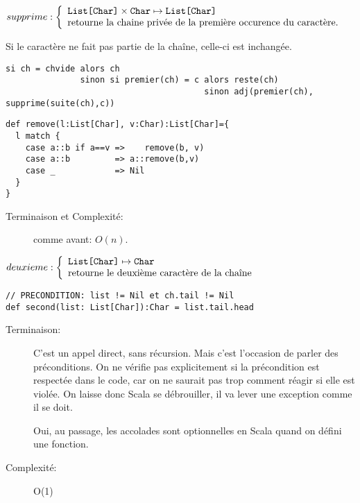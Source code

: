 \documentclass[10pt]{article}\usepackage[nu]{esial}
\begin{document}
\begin{Question}
  $supprime: \left\{
    \begin{array}{l}
      \text{\texttt{List[Char]}}\times \text{\texttt{Char}}\mapsto \text{\texttt{List[Char]}}\\
      \text{retourne la chaine privée de la première occurence du caractère.}
    \end{array}\right.$  

  Si le caractère ne fait pas partie de la chaîne, celle-ci est inchangée.
\end{Question}
\begin{Reponse}
  \begin{Verbatim}[label=supprime(ch\quotesinglbase c)]
si ch = chvide alors ch
               sinon si premier(ch) = c alors reste(ch)
                                        sinon adj(premier(ch), supprime(suite(ch),c))
  \end{Verbatim}
  \begin{Verbatim}
def remove(l:List[Char], v:Char):List[Char]={
  l match {
    case a::b if a==v =>    remove(b, v)
    case a::b         => a::remove(b,v)
    case _            => Nil
  }
}    
  \end{Verbatim}
  \begin{description}
  \item[Terminaison et Complexité:] comme avant: $O(n)$. 
  \end{description}
\end{Reponse}

\begin{Question}
  $deuxieme: \left\{
    \begin{array}{l}
      \text{\texttt{List[Char]}}\mapsto \text{\texttt{Char}}\\
      \text{retourne le deuxième caractère de la chaîne}
    \end{array}\right.$  
\end{Question}
\begin{Reponse}
  \begin{Verbatim}[]
// PRECONDITION: list != Nil et ch.tail != Nil
def second(list: List[Char]):Char = list.tail.head
  \end{Verbatim}
  \begin{description}
  \item[Terminaison:] C'est un appel direct, sans récursion. Mais c'est
    l'occasion de parler des préconditions.  On ne vérifie pas explicitement si
    la précondition est respectée dans le code, car on ne saurait pas trop
    comment réagir si elle est violée. On laisse donc Scala se débrouiller, il
    va lever une exception comme il se doit.

    Oui, au passage, les accolades sont optionnelles en Scala quand on défini
    une fonction.
  \item[Complexité:] O(1)
  \end{description}
\end{Reponse}
\end{document}
